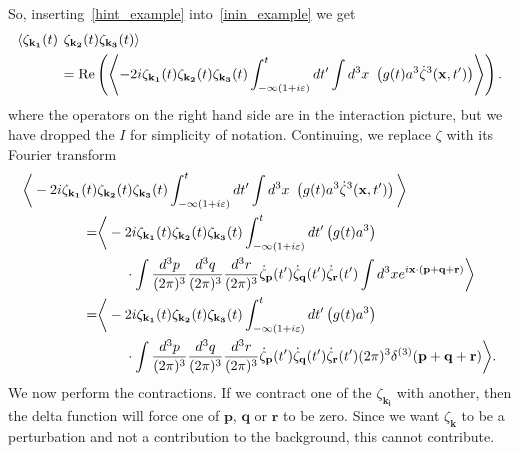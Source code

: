 So, inserting~\eqref{hint_example} into~\eqref{inin_example}
we get
\begin{align}\label{inin_example_start}
    \left<\zeta_{\mathbf{k_1}}(t)\right.&\left.\zeta_{\mathbf{k_2}}(t)\zeta_{\mathbf{k_3}}(t)\right>\\
    &=\operatorname{Re}\left(\left<-2i \zeta_{\mathbf{k_1}}(t)\zeta_{\mathbf{k_2}}(t)\zeta_{\mathbf{k_3}}(t)
    \int_{-\infty(1+i\varepsilon)}^{t}dt'
    \int d^3x~\left(g(t) a^3\dot{\zeta}^3(\mathbf{x},t')\right)
    \right>\right).
\end{align}
where the operators on the right hand side are in the interaction picture,
but we have dropped the $I$ for simplicity of notation.
Continuing, we replace $\zeta$ with its Fourier transform
\begin{align}\label{inin_example_2}
    \bigg<-2i \zeta_{\mathbf{k_1}}(t)&\zeta_{\mathbf{k_2}}(t)\zeta_{\mathbf{k_3}}(t)
    \int_{-\infty(1+i\varepsilon)}^{t}dt'
    \int d^3x~\left(g(t) a^3\dot{\zeta}^3(\mathbf{x},t')\right)
    \bigg>\\
    =&\bigg<-2i \zeta_{\mathbf{k_1}}(t)\zeta_{\mathbf{k_2}}(t)\zeta_{\mathbf{k_3}}(t)
    \int_{-\infty(1+i\varepsilon)}^{t}dt'\left(g(t) a^3\right)\nonumber\\
    &\qquad\cdot
    \int \frac{d^3p}{(2\pi)^3}
    \frac{d^3q}{(2\pi)^3}
    \frac{d^3r}{(2\pi)^3}
    \dot{\zeta}_{\mathbf{p}}(t')
    \dot{\zeta}_{\mathbf{q}}(t')
    \dot{\zeta}_{\mathbf{r}}(t')
    \int d^3x e^{i\mathbf{x}\cdot(\mathbf{p}+\mathbf{q}+\mathbf{r})}
    \bigg>\\
    =&\bigg<-2i \zeta_{\mathbf{k_1}}(t)\zeta_{\mathbf{k_2}}(t)\zeta_{\mathbf{k_3}}(t)
    \int_{-\infty(1+i\varepsilon)}^{t}dt'\left(g(t) a^3\right)\nonumber\\
    &\qquad\cdot
    \int \frac{d^3p}{(2\pi)^3}
    \frac{d^3q}{(2\pi)^3}
    \frac{d^3r}{(2\pi)^3}
    \dot{\zeta}_{\mathbf{p}}(t')
    \dot{\zeta}_{\mathbf{q}}(t')
    \dot{\zeta}_{\mathbf{r}}(t')
    (2\pi)^3\delta^{(3)}(\mathbf{p}+\mathbf{q}+\mathbf{r})
    \bigg>.
\end{align}
We now perform the contractions. If we contract one of the $\zeta_{\mathbf{k_i}}$ with
another, then the delta function will force one of $\mathbf{p}$, $\mathbf{q}$
or $\mathbf{r}$ to be zero. Since we want $\zeta_\mathbf{k}$ to be a perturbation
and not a contribution to the background, this cannot contribute.


